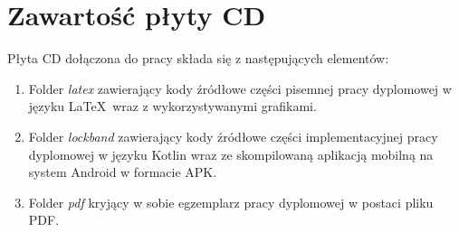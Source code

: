 \chapter{Zawartość płyty CD}
\thispagestyle{chapterBeginStyle}
\label{plytaCD}

Płyta CD dołączona do pracy składa się z następujących elementów:
\begin{enumerate}
    \item Folder \textit{latex} zawierający kody źródłowe części pisemnej pracy dyplomowej w języku \LaTeX\, wraz z wykorzystywanymi grafikami.
    \item Folder \textit{lockband} zawierający kody źródłowe części implementacyjnej pracy dyplomowej w języku Kotlin wraz ze skompilowaną aplikacją mobilną na system Android w formacie APK. 
    \item Folder \textit{pdf} kryjący w sobie egzemplarz pracy dyplomowej w postaci pliku PDF.
\end{enumerate}


